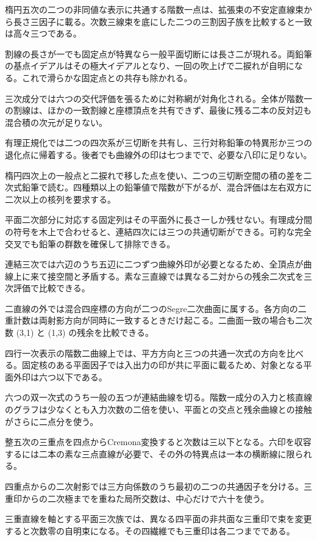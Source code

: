 \documentclass[11pt,a4paper]{ltjsarticle}
\begin{document}
楕円五次の二つの非同値な表示に共通する階数一点は、拡張束の不安定直線束から長さ三因子に載る。次数三線束を底にした二つの三割因子族を比較すると一致は高々三つである。

割線の長さが一でも固定点が特異なら一般平面切断には長さ二が現れる。両鉛筆の基点イデアルはその極大イデアルとなり、一回の吹上げで二捩れが自明になる。これで滑らかな固定点との共存も除かれる。

三次成分では六つの交代評価を張るために対称網が対角化される。全体が階数一の割線は、ほかの一致割線と座標頂点を共有できず、最後に残る二本の反対辺も混合積の次元が足りない。

有理正規化では二つの四次系が三切断を共有し、三行対称鉛筆の特異形か三つの退化点に帰着する。後者でも曲線外の印は七つまでで、必要な八印に足りない。

楕円四次上の一般点と二捩れで移した点を使い、二つの三切断空間の積の差を二次式鉛筆で読む。四種類以上の鉛筆値で階数が下がるが、混合評価は左右双方に二次以上の核列を要求する。

平面二次部分に対応する固定列はその平面外に長さ一しか残せない。有理成分間の符号を木上で合わせると、連結四次には三つの共通切断ができる。可約な完全交叉でも鉛筆の群数を確保して排除できる。

連結三次では六辺のうち五辺に二つずつ曲線外印が必要となるため、全頂点が曲線上に来て接空間と矛盾する。素な三直線では異なる二対からの残余二次式を三次評価で比較できる。

二直線の外では混合四座標の方向が二つのSegre二次曲面に属する。各方向の二重計数は両射影方向が同時に一致するときだけ起こる。二曲面一致の場合も二次数 (3,1) と (1,3) の残余を比較できる。

四行一次表示の階数二曲線上では、平方方向と三つの共通一次式の方向を比べる。固定核のある平面因子では入出力の印が共に平面に載るため、対象となる平面外印は六つ以下である。

六つの双一次式のうち一般の五つが連結曲線を切る。階数一成分の入力と核直線のグラフは少なくとも入力次数の二倍を使い、平面との交点と残余曲線との接触がさらに二点分を使う。

整五次の三重点を四点からCremona変換すると次数は三以下となる。六印を収容するには二本の素な三点直線が必要で、その外の特異点は一本の横断線に限られる。

四重点からの二次射影では三方向係数のうち最初の二つの共通因子を分ける。三重印からの二次極までを重ねた局所交数は、中心だけで六十を使う。

三重直線を軸とする平面三次族では、異なる四平面の非共面な三重印で束を変更すると次数零の自明束になる。その四繊維でも三重印は各二つまでである。
\end{document}
